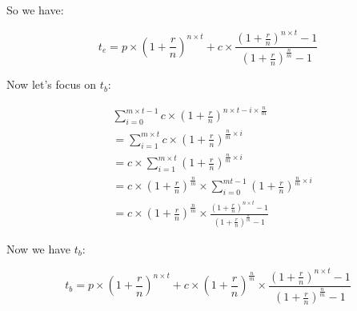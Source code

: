 \documentclass{book}
\begin{document}
	So we have:
	
	\begin{equation*}
		t_e = p \times (1 + \frac{r}{n})^{n \times t} + c \times \frac{(1 + \frac{r}{n})^{n \times t} - 1}{(1 + \frac{r}{n})^{\frac{n}{m}} - 1}
	\end{equation*}
	
	Now let's focus on $t_b$:
	
	\begin{equation*}
		\begin{split}
			&\sum_{i = 0}^{m \times t - 1}{c \times (1 + \frac{r}{n})^{n \times t - i \times \frac{n}{m}}} \\
			&= \sum_{i = 1}^{m \times t}{c \times (1 + \frac{r}{n})^{\frac{n}{m} \times i}} \\
			&= c \times \sum_{i = 1}^{m \times t}{(1 + \frac{r}{n})^{\frac{n}{m} \times i}} \\
			&= c \times (1 + \frac{r}{n})^{\frac{n}{m}} \times \sum_{i = 0}^{mt - 1}{(1 + \frac{r}{n})^{\frac{n}{m} \times i}} \\
			&= c \times (1 + \frac{r}{n})^{\frac{n}{m}} \times \frac{(1 + \frac{r}{n})^{n \times t} - 1}{(1 + \frac{r}{n})^{\frac{n}{m}} - 1}
		\end{split}
	\end{equation*}
	
	Now we have $t_b$:
	
	\begin{equation*}
		t_b = p \times (1 + \frac{r}{n})^{n \times t} + c \times (1 + \frac{r}{n})^{\frac{n}{m}} \times \frac{(1 + \frac{r}{n})^{n \times t} - 1}{(1 + \frac{r}{n})^{\frac{n}{m}} - 1}
	\end{equation*}
\end{document}
